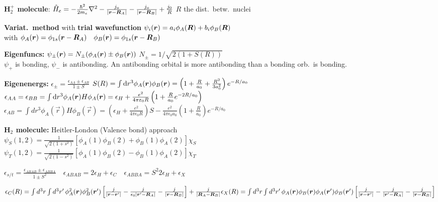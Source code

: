 \textbf{H$_2^+$ molecule}: $\ham_e = - \frac{\hbar^2}{2m_e} \nabla^2 - \frac{j_o}{|\vr - \vR_A|} - \frac{j_o}{|\vr - \vR_B|} + \frac{j_0}{R}$ \quad $R$ the dist.\ betw.\ nuclei 
\begin{squishlist}
    \item \textbf{Variat.\ method} with \textbf{trial wavefunction} $\psi_i(\vr) = a_i \phi_A(\vR) + b_i \phi_B(\vR)$ \\ with $\phi_A(\vr)=\phi_{1s}(\vr - \vR_A) \quad \phi_B(\vr)=\phi_{1s}(\vr - \vR_B)$ 
    \item \textbf{Eigenfuncs:} $\psi_{\pm}(\vr) = N_{\pm} (\phi_A(\vr)\pm \phi_B(\vr))$ \quad $N_{\pm} = 1/\sqrt{2(1+S(R))} $
     \\
    $\psi_+$ is bonding, $\psi_-$ is antibonding. An antibonding orbital is more antibonding than a bonding orb.\ is bonding.
    \item \textbf{Eigenenergs:} $\epsilon_{\pm} = \frac{\epsilon_{AA} \pm \epsilon_{AB}}{1\pm S}$ \quad  $S(R) = \int \ud r^3 \phi_A(\vr) \phi_B(\vr) = \left(1 + \frac{R}{a_0} + \frac{R^2}{3a_0^2}\right) e^{-R/a_0}$\\
    $\epsilon_{AA} = \epsilon_{BB} = \int \ud r^3 \phi_{A}(\vr) H \phi_{A}(\vr) = \epsilon_H + \frac{e^2}{4\pi\varepsilon_0 R}\left(1 + \frac{R}{a_0}e^{-2R/a_0}\right)$ \\
    $\epsilon_{AB} = \int dr^3 \phi_A(\vec{r}) H \phi_B(\vec{r}) = \left(\epsilon_H +  \frac{e^2}{4 \pi \epsilon_0R}\right) S - \frac{e^2}{4 \pi \epsilon_0a_0} \left( 1 + \frac{R}{a_0} \right) e^{-R/a_0}$
\end{squishlist}

\squishline

\begin{squishlist}
    \item \textbf{H$_2$ molecule:} Heitler-London (Valence bond) approach \\
    $\psi_S(1,2) = \frac{1}{\sqrt{2(1+s^2)}} \left[\phi_A(1)\phi_B(2) + \phi_B(1)\phi_A(2)\right] \chi_S$ \\
    $\psi_T(1,2) = \frac{1}{\sqrt{2(1-s^2)}} \left[\phi_A(1)\phi_B(2) - \phi_B(1)\phi_A(2)\right] \chi_T$
    \item $\epsilon_{s/t} = \frac{\epsilon_{ABAB} \pm \epsilon_{ABBA}}{1 \pm S^2} \quad \epsilon_{ABAB} = 2 \epsilon_H + \epsilon_C \quad \epsilon_{ABBA} = S^2 2 \epsilon_H + \epsilon_{X}$
    \item $\epsilon_C(R) = \int d^3r \int d^3r' \, \phi_A^2 (\vec{r}) \phi_B^2 (\vec{r}') \left[ \frac{j}{|\vec{r} - \vec{r}'|}  - \frac{j}{\epsilon_0|\vec{r}' - \vec{R}_A|} - \frac{j}{|\vec{r} - \vec{R}_B|} \right]  + \frac{j}{|\vec{R}_A - \vec{R}_B|}\\
    \epsilon_{X}(R) = \int d^3r \int d^3r' \, \phi_A (\vec{r}) \phi_B (\vec{r}) \phi_A (\vec{r}') \phi_B (\vec{r}')  \left[ \frac{j}{|\vec{r} - \vec{r}'|}  - \frac{j}{|\vec{r}' - \vec{R}_A|}  - \frac{j}{|\vec{r} - \vec{R}_B|} \right]$
\end{squishlist}

